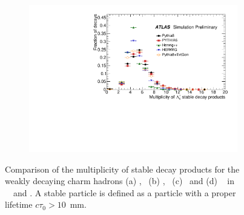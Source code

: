 \begin{figure}
\begin{subfigure}[]{0.45\textwidth}
\end{subfigure}
\begin{subfigure}[]{0.45\textwidth}
\includegraphics[width=\textwidth]{evtgen/figures/EvtGen/Lambdac+/h_species_multiplicity.pdf}
\end{subfigure}
\caption{Comparison of the multiplicity of stable decay products for the weakly decaying 
charm hadrons 
(a) \Dzero,~ (b) \Dplus,~ (c) \Ds\ and (d) \Lc~ in \PythiaE\,~ \Pythia\, \newline  \Herwigpp\, ~\Herwig\ and \EvtGen.
A stable particle is defined
as a particle with a proper lifetime $c\tau_{0}>10$~mm. }
\label{fig:cmult}
\end{figure}




